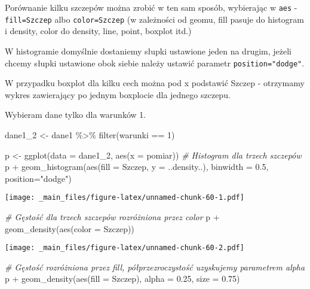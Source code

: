 \documentclass[
]{book}
\newenvironment{Shaded}{\begin{snugshade}}{\end{snugshade}}
\newcommand{\AttributeTok}[1]{\textcolor[rgb]{0.77,0.63,0.00}{#1}}
\newcommand{\CommentTok}[1]{\textcolor[rgb]{0.56,0.35,0.01}{\textit{#1}}}
\newcommand{\DecValTok}[1]{\textcolor[rgb]{0.00,0.00,0.81}{#1}}
\newcommand{\FloatTok}[1]{\textcolor[rgb]{0.00,0.00,0.81}{#1}}
\newcommand{\FunctionTok}[1]{\textcolor[rgb]{0.00,0.00,0.00}{#1}}
\newcommand{\NormalTok}[1]{#1}
\newcommand{\OtherTok}[1]{\textcolor[rgb]{0.56,0.35,0.01}{#1}}
\newcommand{\SpecialCharTok}[1]{\textcolor[rgb]{0.00,0.00,0.00}{#1}}
\newcommand{\StringTok}[1]{\textcolor[rgb]{0.31,0.60,0.02}{#1}}
\begin{document}
Porównanie kilku szczepów można zrobić w ten sam sposób, wybierając w \texttt{aes} - \texttt{fill=Szczep} albo \texttt{color=Szczep} (w zależności od geomu, fill pasuje do histogram i density, color do density, line, point, boxplot itd.)

W histogramie domyślnie dostaniemy słupki ustawione jeden na drugim, jeżeli chcemy słupki ustawione obok siebie należy ustawić parametr \texttt{position="dodge"}.

W przypadku boxplot dla kilku cech można pod x podstawić Szczep - otrzymamy wykres zawierający po jednym boxplocie dla jednego szczepu.

Wybieram dane tylko dla warunków 1.

\begin{Shaded}
\begin{Highlighting}[]
\NormalTok{dane1\_2 }\OtherTok{\textless{}{-}}\NormalTok{ dane1 }\SpecialCharTok{\%\textgreater{}\%} \FunctionTok{filter}\NormalTok{(warunki }\SpecialCharTok{==} \DecValTok{1}\NormalTok{)}

\NormalTok{p }\OtherTok{\textless{}{-}} \FunctionTok{ggplot}\NormalTok{(}\AttributeTok{data =}\NormalTok{ dane1\_2, }\FunctionTok{aes}\NormalTok{(}\AttributeTok{x =}\NormalTok{ pomiar))}
\CommentTok{\# Histogram dla trzech szczepów}
\NormalTok{p }\SpecialCharTok{+} \FunctionTok{geom\_histogram}\NormalTok{(}\FunctionTok{aes}\NormalTok{(}\AttributeTok{fill =}\NormalTok{ Szczep, }\AttributeTok{y =}\NormalTok{ ..density..), }\AttributeTok{binwidth =} \FloatTok{0.5}\NormalTok{, }
                   \AttributeTok{position=}\StringTok{"dodge"}\NormalTok{)}
\end{Highlighting}
\end{Shaded}

\texttt{[image: \_main\_files/figure-latex/unnamed-chunk-60-1.pdf]}

\begin{Shaded}
\begin{Highlighting}[]
\CommentTok{\# Gęstość dla trzech szczepów rozróżniona przez color}
\NormalTok{p }\SpecialCharTok{+} \FunctionTok{geom\_density}\NormalTok{(}\FunctionTok{aes}\NormalTok{(}\AttributeTok{color =}\NormalTok{ Szczep))}
\end{Highlighting}
\end{Shaded}

\texttt{[image: \_main\_files/figure-latex/unnamed-chunk-60-2.pdf]}

\begin{Shaded}
\begin{Highlighting}[]
\CommentTok{\# Gęstość rozróżniona przez fill, półprzezroczystość uzyskujemy parametrem alpha}
\NormalTok{p }\SpecialCharTok{+} \FunctionTok{geom\_density}\NormalTok{(}\FunctionTok{aes}\NormalTok{(}\AttributeTok{fill =}\NormalTok{ Szczep), }\AttributeTok{alpha =} \FloatTok{0.25}\NormalTok{, }\AttributeTok{size =} \FloatTok{0.75}\NormalTok{)}
\end{Highlighting}
\end{Shaded}
\end{document}
